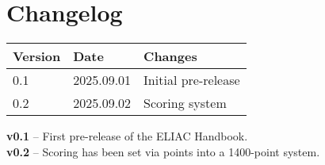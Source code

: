 
\section*{Changelog}

\begin{tabular}{lll}
\toprule
Version & Date & Changes \\
\midrule
0.1 & 2025.09.01 & Initial pre-release \\
\midrule
0.2 & 2025.09.02 & Scoring system\\
\bottomrule
\end{tabular}

\vspace{1cm}

\noindent\textbf{v0.1} – First pre-release of the ELIAC Handbook.\\
\noindent\textbf{v0.2} – Scoring has been set via points into a 1400-point system.

